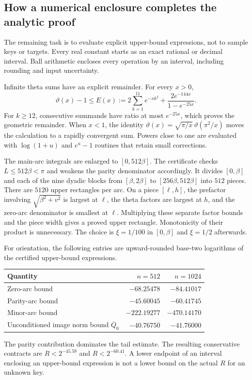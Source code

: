 \documentclass[11pt,a4paper]{article}
\theoremstyle{definition}
\theoremstyle{remark}
\numberwithin{equation}{section}
\begin{document}
\subsection{How a numerical enclosure completes the analytic proof}

The remaining task is to evaluate explicit upper-bound expressions,
not to sample keys or targets. Every real constant starts as an exact
rational or decimal interval. Ball arithmetic encloses every operation
by an interval, including rounding and input uncertainty.

Infinite theta sums have an explicit remainder. For every $x>0$,
\[
 \vartheta(x)-1\le
 E(x):=2\sum_{k=1}^{11}e^{-xk^2}
       +\frac{2e^{-144x}}{1-e^{-25x}}.
\]
For $k\ge12$, consecutive summands have ratio at most $e^{-25x}$,
which proves the geometric remainder. When $x<1$, the identity
$\vartheta(x)=\sqrt{\pi/x}\,\vartheta(\pi^2/x)$ moves the calculation
to a rapidly convergent sum. Powers close to one are evaluated with
$\log(1+u)$ and $e^u-1$ routines that retain small corrections.

The main-arc integrals are enlarged to $[0,512\beta]$. The certificate
checks $L\le512\beta<\pi$ and weakens the parity denominator
accordingly. It divides $[0,\beta]$ and each of the nine dyadic blocks
from $[\beta,2\beta]$ to $[256\beta,512\beta]$ into $512$ pieces.
There are $5120$ upper rectangles per arc. On a piece $[\ell,h]$,
the prefactor involving $\sqrt{\beta^2+v^2}$ is largest at $\ell$,
the theta factors are largest at $h$, and the zero-arc denominator is
smallest at $\ell$. Multiplying these separate factor bounds and the
piece width gives a proved upper rectangle. Monotonicity of their
product is unnecessary. The choice is $\xi=1/100$ in
$[0,\beta]$ and $\xi=1/2$ afterwards.

For orientation, the following entries are upward-rounded base-two
logarithms of the certified upper-bound expressions.
\begin{center}
\begin{tabular}{@{}lrr@{}}
\toprule
Quantity & $n=512$ & $n=1024$\\
\midrule
Zero-arc bound & $-68.25478$ & $-84.41017$\\
Parity-arc bound & $-45.60045$ & $-60.41745$\\
Minor-arc bound & $-222.19277$ & $-470.14170$\\
Unconditioned image norm bound $\overline Q_0$ & $-40.76750$ & $-41.76000$\\
\bottomrule
\end{tabular}
\end{center}
The parity contribution dominates the tail estimate. The resulting
conservative contracts are $R<2^{-45.59}$ and $R<2^{-60.41}$.
A lower endpoint of an interval enclosing an upper-bound expression is
not a lower bound on the actual $R$ for an unknown key.
\end{document}
